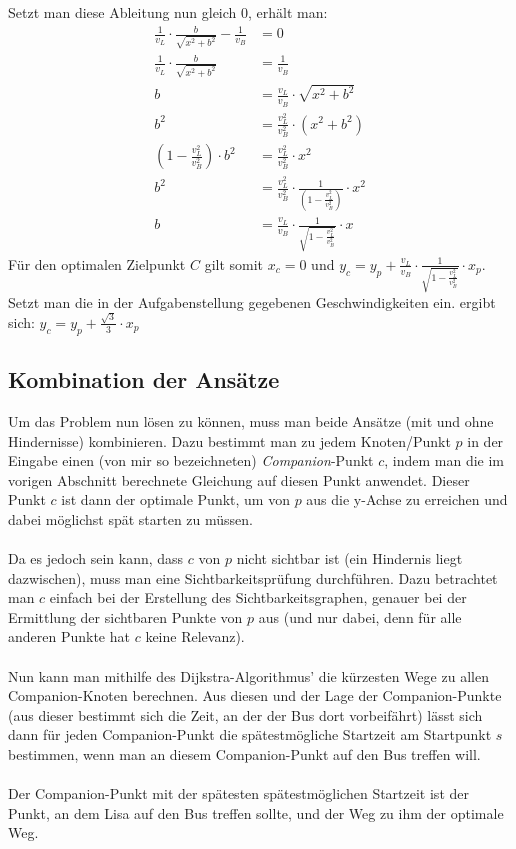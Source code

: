 \documentclass[a4paper, notitlepage, 12pt]{scrartcl}
\begin{document}
 Setzt man diese Ableitung nun gleich $0$, erhält man:
 \begin{align}
 \frac{1}{v_L} \cdot \frac{b}{\sqrt{x^2 + b^2}} - \frac{1}{v_B} &= 0 \\
 \frac{1}{v_L} \cdot \frac{b}{\sqrt{x^2 + b^2}} &= \frac{1}{v_B} \\
 b &= \frac{v_L}{v_B} \cdot \sqrt{x^2 + b^2} \\
 b^2 &= \frac{v_L^2}{v_B^2} \cdot (x^2 + b^2) \\
 (1 - \frac{v_L^2}{v_B^2}) \cdot b^2 &= \frac{v_L^2}{v_B^2} \cdot x^2 \\
 b^2 &= \frac{v_L^2}{v_B^2} \cdot \frac{1}{(1 - \frac{v_L^2}{v_B^2})} \cdot x^2 \\
 b &= \frac{v_L}{v_B} \cdot \frac{1}{\sqrt{1 - \frac{v_L^2}{v_B^2}}} \cdot x
 \end{align}
 Für den optimalen Zielpunkt $C$ gilt somit $x_c = 0$ und $y_c = y_p + \frac{v_L}{v_B} \cdot \frac{1}{\sqrt{1 - \frac{v_L^2}{v_B^2}}} \cdot x_p$. Setzt man die in der Aufgabenstellung gegebenen Geschwindigkeiten ein. ergibt sich: $y_c = y_p + \frac{\sqrt{3}}{3} \cdot x_p$
 \subsection{Kombination der Ansätze}
 Um das Problem nun lösen zu können, muss man beide Ansätze (mit und ohne Hindernisse) kombinieren. Dazu bestimmt man zu jedem Knoten/Punkt $p$ in der Eingabe einen (von mir so bezeichneten) \textit{Companion}-Punkt $c$, indem man die im vorigen Abschnitt berechnete Gleichung auf diesen Punkt anwendet. Dieser Punkt $c$ ist dann der optimale Punkt, um von $p$ aus die y-Achse zu erreichen und dabei möglichst spät starten zu müssen. \\ \\
 Da es jedoch sein kann, dass $c$ von $p$ nicht sichtbar ist (ein Hindernis liegt dazwischen), muss man eine Sichtbarkeitsprüfung durchführen. Dazu betrachtet man $c$ einfach bei der Erstellung des Sichtbarkeitsgraphen, genauer bei der Ermittlung der sichtbaren Punkte von $p$ aus (und nur dabei, denn für alle anderen Punkte hat $c$ keine Relevanz). \\ \\
 Nun kann man mithilfe des Dijkstra-Algorithmus' die kürzesten Wege zu allen Companion-Knoten berechnen. Aus diesen und der Lage der Companion-Punkte (aus dieser bestimmt sich die Zeit, an der der Bus dort vorbeifährt) lässt sich dann für jeden Companion-Punkt die spätestmögliche Startzeit am Startpunkt $s$ bestimmen, wenn man an diesem Companion-Punkt auf den Bus treffen will. \\ \\
 Der Companion-Punkt mit der spätesten spätestmöglichen Startzeit ist der Punkt, an dem Lisa auf den Bus treffen sollte, und der Weg zu ihm der optimale Weg.
\end{document}
